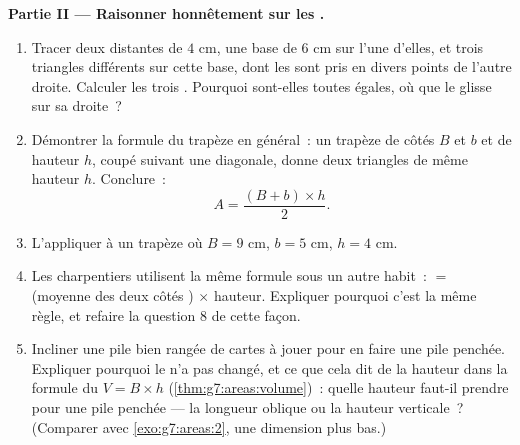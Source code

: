 \begin{problem}[{Devoir maison --- une célèbre «~preuve~» que
$64 = 65$, démasquée par les aires et les pentes, avec pizzas et
anneaux pour le dessert}]
\medskip
\noindent\textbf{Partie II --- Raisonner honnêtement sur les .}
\begin{enumerate}[resume]
  \item Tracer deux  distantes de $4$ cm, une base
        de $6$ cm sur l'une d'elles, et trois triangles différents
        sur cette base, dont les  sont pris en divers points
        de l'autre droite. Calculer les trois . Pourquoi
        sont-elles toutes égales, où que le  glisse sur sa
        droite~?
  \item Démontrer la formule du trapèze en général~: un trapèze de
        côtés  $B$ et $b$ et de hauteur $h$, coupé suivant
        une diagonale, donne deux triangles de même hauteur $h$.
        Conclure~:
        \[
        A = \frac{(B + b) \times h}{2} .
        \]
  \item L'appliquer à un trapèze où $B = 9$ cm, $b = 5$ cm,
        $h = 4$ cm.
  \item Les charpentiers utilisent la même formule sous un autre
        habit~:  $=$ (moyenne des deux côtés )
        $\times$ hauteur. Expliquer pourquoi c'est la même règle, et
        refaire la question 8 de cette façon.
  \item Incliner une pile bien rangée de cartes à jouer pour en
        faire une pile penchée. Expliquer pourquoi le  n'a pas
        changé, et ce que cela dit de la hauteur dans la formule du
         $V = B \times h$
        (\cref{thm:g7:areas:volume})~: quelle hauteur faut-il
        prendre pour une pile penchée --- la longueur oblique ou la
        hauteur verticale~? (Comparer avec
        \cref{exo:g7:areas:2}, une dimension plus bas.)
\end{enumerate}


\end{problem}
